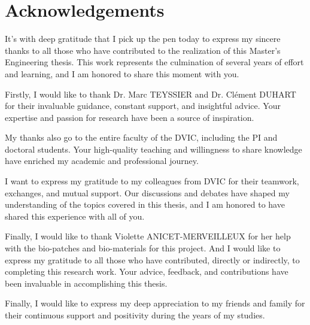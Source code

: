 \section*{Acknowledgements}
It’s with deep gratitude that I pick up the pen today to express my sincere thanks to all those who have contributed to the realization of this Master's Engineering thesis. This work represents the culmination of several years of effort and learning, and I am honored to share this moment with you.

Firstly, I would like to thank Dr. Marc TEYSSIER and Dr. Clément DUHART for their invaluable guidance, constant support, and insightful advice. Your expertise and passion for research have been a source of inspiration.

My thanks also go to the entire faculty of the DVIC, including the PI and doctoral students. Your high-quality teaching and willingness to share knowledge have enriched my academic and professional journey.

I want to express my gratitude to my colleagues from DVIC for their teamwork, exchanges, and mutual support. Our discussions and debates have shaped my understanding of the topics covered in this thesis, and I am honored to have shared this experience with all of you.

Finally, I would like to thank Violette ANICET-MERVEILLEUX for her help with the bio-patches and bio-materials for this project. And I would like to express my gratitude to all those who have contributed, directly or indirectly, to completing this research work. Your advice, feedback, and contributions have been invaluable in accomplishing this thesis.

Finally, I would like to express my deep appreciation to my friends and family for their continuous support and positivity during the years of my studies.
